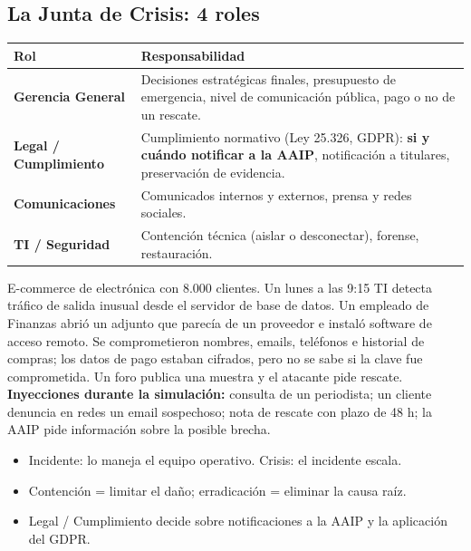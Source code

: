 \documentclass[12pt,a4paper]{article}
\begin{document}
\subsection{La Junta de Crisis: 4 roles}
\begin{tabularx}{\textwidth}{|>{\bfseries}p{3.6cm}|X|}
\hline
\rowcolor{grisClaro}
Rol & Responsabilidad \\
\hline
Gerencia General & Decisiones estrat\'egicas finales, presupuesto de emergencia, nivel de comunicaci\'on p\'ublica, pago o no de un rescate. \\
\hline
Legal / Cumplimiento & Cumplimiento normativo (Ley 25.326, GDPR): \textbf{si y cu\'ando notificar a la AAIP}, notificaci\'on a titulares, preservaci\'on de evidencia. \\
\hline
Comunicaciones & Comunicados internos y externos, prensa y redes sociales. \\
\hline
TI / Seguridad & Contenci\'on t\'ecnica (aislar o desconectar), forense, restauraci\'on. \\
\hline
\end{tabularx}

\begin{cajaCaso}[title={Simulaci\'on ``DataShop''}]
E-commerce de electr\'onica con 8.000 clientes. Un lunes a las 9:15 TI detecta
tr\'afico de salida inusual desde el servidor de base de datos. Un empleado de
Finanzas abri\'o un adjunto que parec\'ia de un proveedor e instal\'o software de
acceso remoto. Se comprometieron nombres, emails, tel\'efonos e historial de compras;
los datos de pago estaban cifrados, pero no se sabe si la clave fue comprometida. Un
foro publica una muestra y el atacante pide rescate.\\[3pt]
\textbf{Inyecciones durante la simulaci\'on:} consulta de un periodista; un cliente
denuncia en redes un email sospechoso; nota de rescate con plazo de 48 h; la AAIP
pide informaci\'on sobre la posible brecha.
\end{cajaCaso}

\begin{cajaResumen}
\begin{itemize}
  \item Incidente: lo maneja el equipo operativo. Crisis: el incidente escala.
  \item Contenci\'on = limitar el da\~no; erradicaci\'on = eliminar la causa ra\'iz.
  \item Legal / Cumplimiento decide sobre notificaciones a la AAIP y la aplicaci\'on del GDPR.
\end{itemize}
\end{cajaResumen}
\end{document}
